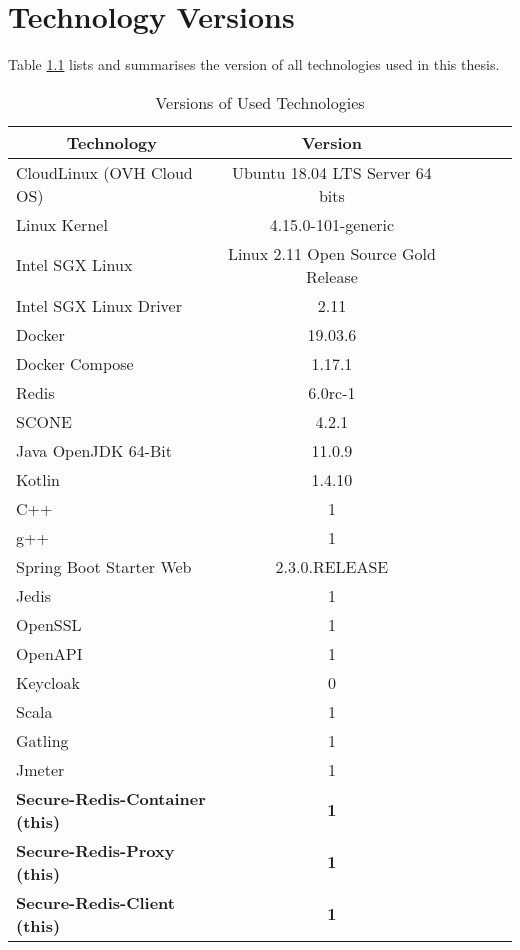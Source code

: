 \chapter{Technology Versions}
\label{ann:technology_versions}

Table \ref{tab:versions_of_used_technologies} lists and summarises the version of all technologies used in this thesis.

\begin{table}[ht]
	\caption{Versions of Used Technologies}
	\label{tab:versions_of_used_technologies}
\centering
\begin{tabular}{lccccc}
	\toprule
	\multicolumn{1}{c}{\textbf{Technology}} 	& \multicolumn{1}{c}{\textbf{Version}} \\
	\midrule
		CloudLinux (OVH Cloud OS) 			& 		Ubuntu 18.04 LTS Server 64 bits 	\\
		Linux Kernel						&		4.15.0-101-generic					\\
		Intel SGX Linux						&		Linux 2.11 Open Source Gold Release \\
		Intel SGX Linux	Driver				&		2.11 								\\
		Docker								& 		19.03.6 								\\
		Docker Compose						& 		1.17.1 								\\
		Redis								& 		6.0rc-1 								\\
		SCONE 								& 		4.2.1 								\\
		Java OpenJDK 64-Bit 					& 		11.0.9								\\
		Kotlin 								& 		1.4.10								\\
		C++									& 		1									\\
		g++									& 		1									\\
		Spring Boot Starter	Web				& 		2.3.0.RELEASE						\\
		Jedis								&		1									\\
		OpenSSL								&		1									\\
		OpenAPI								&		1									\\
		Keycloak							& 		0									\\
		Scala								& 		1									\\
		Gatling								& 		1									\\
		Jmeter								&		1									\\
	\midrule
	\textbf{Secure-Redis-Container (this)}	&		\textbf{1}							\\
	\textbf{Secure-Redis-Proxy (this)}		&		\textbf{1}							\\
	\textbf{Secure-Redis-Client	(this)}		&		\textbf{1}							\\
	\bottomrule
\end{tabular}
\end{table}


